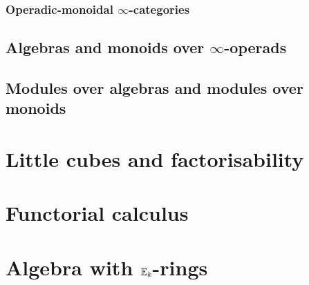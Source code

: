         \subsubsection{Operadic-monoidal \texorpdfstring{$\infty$}{}-categories}
    
    \subsection{Algebras and monoids over \texorpdfstring{$\infty$}{}-operads}
    
    \subsection{Modules over algebras and modules over monoids}

\section{Little cubes and factorisability}

\section{Functorial calculus}

\section{Algebra with \texorpdfstring{$\mathbb{E}_k$}{}-rings}